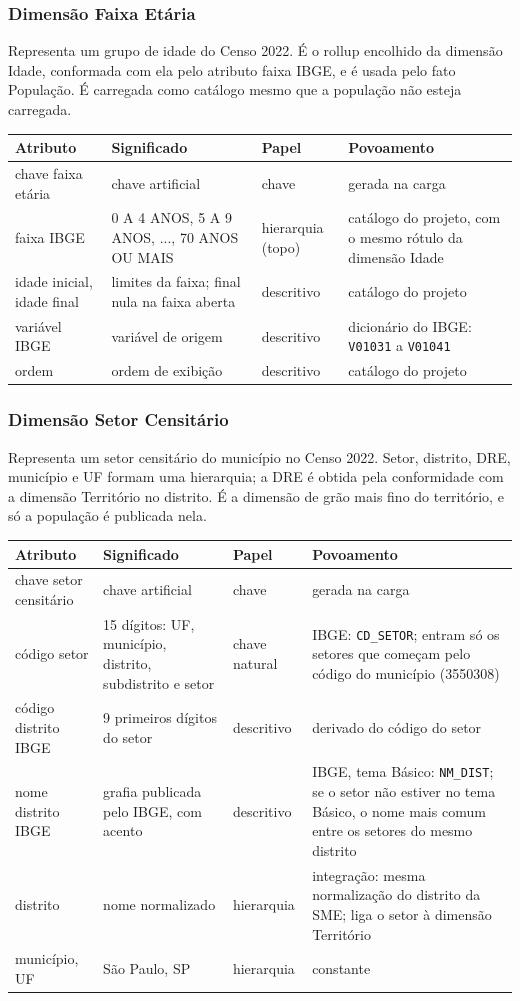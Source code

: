 \documentclass[11pt,a4paper]{article}
\newcommand{\cod}[1]{\texttt{#1}}
\newenvironment{atributos}{%
  \small
  \begin{longtable}{>{\raggedright}p{2.6cm}>{\raggedright}p{4.6cm}>{\raggedright}p{1.9cm}>{\raggedright\arraybackslash}p{5.3cm}}
  \toprule \textbf{Atributo} & \textbf{Significado} & \textbf{Papel} & \textbf{Povoamento}\\ \midrule \endhead
  \bottomrule \endlastfoot
}{\end{longtable}\addtocounter{table}{-1}}
\begin{document}
\subsubsection{Dimensão Faixa Etária}
Representa um grupo de idade do Censo 2022. É o rollup encolhido da dimensão Idade, conformada com ela pelo atributo faixa IBGE, e é usada pelo fato População. É carregada como catálogo mesmo que a população não esteja carregada.

\begin{atributos}
chave faixa etária & chave artificial & chave & gerada na carga \\
faixa IBGE & 0 A 4 ANOS, 5 A 9 ANOS, ..., 70 ANOS OU MAIS & hierarquia (topo) & catálogo do projeto, com o mesmo rótulo da dimensão Idade \\
idade inicial, idade final & limites da faixa; final nula na faixa aberta & descritivo & catálogo do projeto \\
variável IBGE & variável de origem & descritivo & dicionário do IBGE: \cod{V01031} a \cod{V01041} \\
ordem & ordem de exibição & descritivo & catálogo do projeto \\
\end{atributos}

\subsubsection{Dimensão Setor Censitário}
Representa um setor censitário do município no Censo 2022. Setor, distrito, DRE, município e UF formam uma hierarquia; a DRE é obtida pela conformidade com a dimensão Território no distrito. É a dimensão de grão mais fino do território, e só a população é publicada nela.

\begin{atributos}
chave setor censitário & chave artificial & chave & gerada na carga \\
código setor & 15 dígitos: UF, município, distrito, subdistrito e setor & chave natural & IBGE: \cod{CD_SETOR}; entram só os setores que começam pelo código do município (3550308) \\
código distrito IBGE & 9 primeiros dígitos do setor & descritivo & derivado do código do setor \\
nome distrito IBGE & grafia publicada pelo IBGE, com acento & descritivo & IBGE, tema Básico: \cod{NM_DIST}; se o setor não estiver no tema Básico, o nome mais comum entre os setores do mesmo distrito \\
distrito & nome normalizado & hierarquia & integração: mesma normalização do distrito da SME; liga o setor à dimensão Território \\
município, UF & São Paulo, SP & hierarquia & constante \\
\end{atributos}
\end{document}
